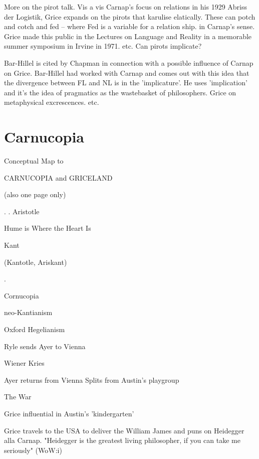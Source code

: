 \documentclass[10pt,titlepage]{book}
\begin{document}
More  on the pirot talk. Vis a vis Carnap’s focus on relations in his 1929  
Abriss der Logistik, Grice expands on the pirots that karulise elatically. 
These  can potch and cotch and fed – where Fed is a variable for a relation 
ship. in  Carnap's sense. Grice made this public in the Lectures on Language 
and Reality  in a  memorable summer symposium in Irvine in 1971. etc. 
Can  pirots implicate?

Bar-Hillel  is cited by Chapman in connection with a 
possible influence of Carnap on Grice.  Bar-Hillel had worked with Carnap 
and comes out with this idea that the  divergence between FL and NL is in the 
'implicature'. He uses 'implication' and  it's the idea of pragmatics as 
the wastebasket of philosophers. Grice on  metaphysical excrescences. etc.  

\section{Carnucopia}
Conceptual  
 Map
                     to
 
CARNUCOPIA and   GRICELAND
 
      (also one page only)
 
 
                       .
                       .
               Aristotle
 
 
          Hume is Where the  Heart Is
 
                  Kant
 
             (Kantotle, Ariskant)
 
 
                   .
 
Cornucopia
 
neo-Kantianism
 
                                  Oxford Hegelianism
 
                                           Ryle sends Ayer to 
                                               Vienna
 
 Wiener Kries
 
 
                                     Ayer returns from Vienna
                              Splits from Austin's playgroup
 
                     The War
 
                                     Grice influential
                                      in Austin's 'kindergarten'
 
                          
                                      Grice  travels to the USA
                                       to deliver the William James
                                       and puns on Heidegger alla
                                       Carnap.
                                    "Heidegger is the greatest living
                                     philosopher, if you can take
                                     me seriously" (WoW:i)
 
\end{document}
